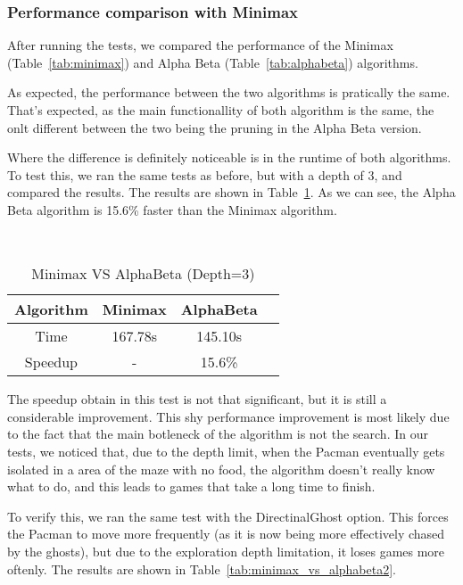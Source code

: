 \documentclass{article}
\begin{document}
\subsubsection{Performance comparison with Minimax}
After running the tests, we compared the performance of the Minimax (Table~\ref{tab:minimax}) and Alpha Beta (Table~\ref{tab:alphabeta}) algorithms.

As expected, the performance between the two algorithms is pratically the same. That's expected, as the main functionallity of both algorithm is the same, the onlt different between the two being the pruning in the Alpha Beta version.

Where the difference is definitely noticeable is in the runtime of both algorithms. To test this, we ran the same tests as before, but with a depth of 3, and compared the results. The results are shown in Table~\ref{tab:minimax_vs_alphabeta}. As we can see, the Alpha Beta algorithm is 15.6\% faster than the Minimax algorithm.

~\\
\begin{table}[!ht]
  \begin{center}
    \begin{tabular}{||c||c|c|c||}
      \hline
      Algorithm & Minimax & AlphaBeta \\
      \hline\hline
      Time & 167.78s & 145.10s \\
      \hline\hline
      Speedup & - & 15.6\% \\
      \hline
    \end{tabular}
    \caption{Minimax VS AlphaBeta (Depth=3)}
    \label{tab:minimax_vs_alphabeta}
  \end{center}
\end{table}

The speedup obtain in this test is not that significant, but it is still a considerable improvement. This shy performance improvement is most likely due to the fact that the main botleneck of the algorithm is not the search. In our tests, we noticed that, due to the depth limit, when the Pacman eventually gets isolated in a area of the maze with no food, the algorithm doesn't really know what to do, and this leads to games that take a long time to finish.

To verify this, we ran the same test with the DirectinalGhost option. This forces the Pacman to move more frequently (as it is now being more effectively chased by the ghosts), but due to the exploration depth limitation, it loses games more oftenly. The results are shown in Table~\ref{tab:minimax_vs_alphabeta2}.
\end{document}
